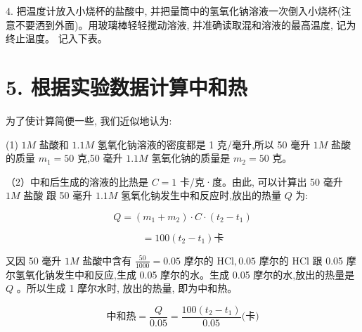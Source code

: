 \documentclass[10pt]{article}
\begin{document}
\begin{center}
\end{center}

4. 把温度计放入小烧杯的盐酸中, 并把量筒中的氢氧化钠溶液一次倒入小烧杯(注意不要洒到外面)。用玻璃棒轻轻搅动溶液, 并准确读取混和溶液的最高温度, 记为终止温度。 记入下表。

\section*{5. 根据实验数据计算中和热}

为了使计算简便一些, 我们近似地认为:

(1) \({1M}\) 盐酸和 \({1.1M}\) 氢氧化钠溶液的密度都是 1 克/毫升,所以 50 毫升 \({1M}\) 盐酸的质量 \({m}_{1} = {50}\) 克,50 毫升 \({1.1M}\) 氢氧化钠的质量是 \({m}_{2} = {50}\) 克。

（2）中和后生成的溶液的比热是 \(C = 1\) 卡/克·度。由此, 可以计算出 50 毫升 \({1M}\) 盐酸 跟 50 毫升 \({1.1M}\) 氢氧化钠发生中和反应时,放出的热量 \(Q\) 为:

\[
Q = \left( {{m}_{1} + {m}_{2}}\right) \cdot C \cdot \left( {{t}_{2} - {t}_{1}}\right)
\]

\[
= {100}\left( {{t}_{2} - {t}_{1}}\right) \text{卡}
\]

又因 50 毫升 \({1M}\) 盐酸中含有 \(\frac{50}{1000} = {0.05}\) 摩尔的 \(\mathrm{{HCl}},{0.05}\) 摩尔的 \(\mathrm{{HCl}}\) 跟 0.05 摩尔氢氧化钠发生中和反应,生成 0.05 摩尔的水。生成 0.05 摩尔的水,放出的热量是 \(Q\) 。所以生成 1 摩尔水时, 放出的热量, 即为中和热。

\[
\text{中和热} = \frac{Q}{0.05} = \frac{{100}\left( {{t}_{2} - {t}_{1}}\right) }{0.05}\text{(卡)}
\]
\end{document}
